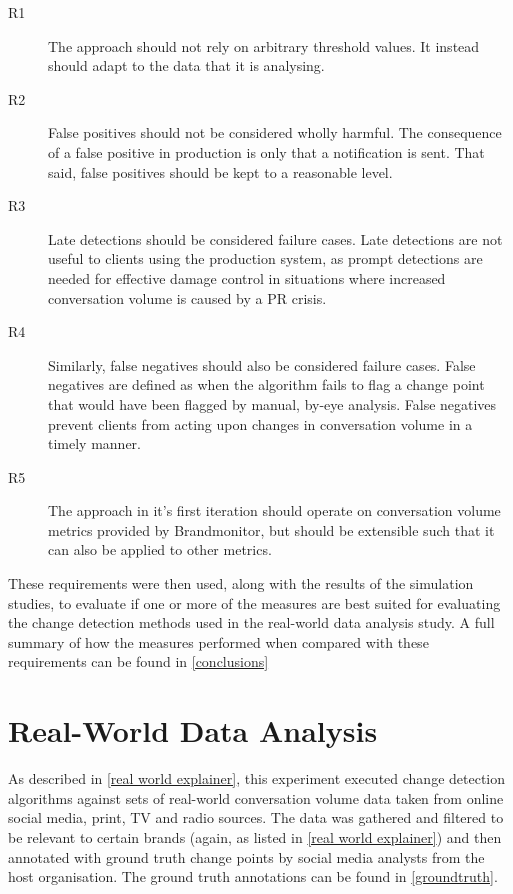 \documentclass[../main.tex]{subfiles}
\begin{document}
\begin{description}
    \item[R1] The approach should not rely on arbitrary threshold values. It instead should adapt to the data that it is analysing.
    \item[R2] False positives should not be considered wholly harmful. The consequence of a false positive in production is only that a notification is sent. That said, false positives should be kept to a reasonable level.
    \item[R3] Late detections should be considered failure cases. Late detections are not useful to clients using the production system, as prompt detections are needed for effective damage control in situations where increased conversation volume is caused by a PR crisis.
    \item[R4] Similarly, false negatives should also be considered failure cases. False negatives are defined as when the algorithm fails to flag a change point that would have been flagged by manual, by-eye analysis. False negatives prevent clients from acting upon changes in conversation volume in a timely manner.
    \item[R5] The approach in it's first iteration should operate on conversation volume metrics provided by Brandmonitor, but should be extensible such that it can also be applied to other metrics.
\end{description}

These requirements were then used, along with the results of the simulation studies, to evaluate if one or more of the measures are best suited for evaluating the change detection methods used in the real-world data analysis study. A full summary of how the measures performed when compared with these requirements can be found in \autoref{conclusions}

\section{Real-World Data Analysis}

As described in \autoref{real world explainer}, this experiment executed change detection algorithms against sets of real-world conversation volume data taken from online social media, print, TV and radio sources. The data was gathered and filtered to be relevant to certain brands (again, as listed in \autoref{real world explainer}) and then annotated with ground truth change points by social media analysts from the host organisation. The ground truth annotations can be found in \autoref{groundtruth}.
\end{document}
